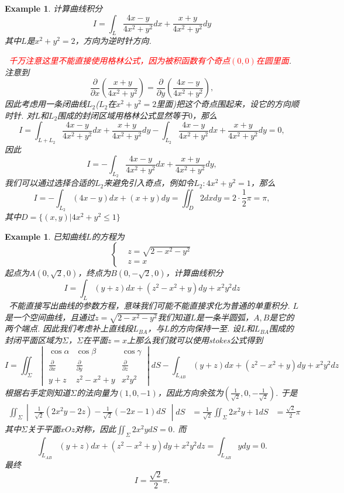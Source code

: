 \documentclass{article}
\newtheorem{example}[theorem]{Example}
\newcommand{\hints}{{\color{blue} \text{hints}}}
\newcommand{\redt}[1]{\textcolor{red}{#1}}
\begin{document}
\begin{example}
\rm 计算曲线积分
$$
I = \int_L \frac{4x-y}{4x^2 + y^2}dx + \frac{x+y}{4x^2+y^2}dy
$$
其中$L$是$x^2+y^2 = 2$，方向为逆时针方向. 

\hints\ \redt{千万注意这里不能直接使用格林公式，因为被积函数有个奇点$(0,0)$在圆里面}. 注意到
$$
\frac{\partial }{\partial x}\left( \frac{x+y}{4x^2+y^2} \right) = \frac{\partial }{\partial y}\left( \frac{4x-y}{4x^2 + y^2} \right),
$$
因此考虑用一条闭曲线$L_2$($L_2$在$x^2 + y^2 = 2$里面)把这个奇点围起来，设它的方向顺时针. 对$L$和$L_2$围成的封闭区域用格林公式显然等于$0$，那么
$$
I = \int_{L+L_2}  \frac{4x-y}{4x^2 + y^2}dx + \frac{x+y}{4x^2+y^2}dy - \int_{L_2}\frac{4x-y}{4x^2 + y^2}dx + \frac{x+y}{4x^2+y^2}dy = 0,
$$
因此
$$
I = - \int_{L_2}\frac{4x-y}{4x^2 + y^2}dx + \frac{x+y}{4x^2+y^2}dy,
$$
我们可以通过选择合适的$L_2$来避免引入奇点，例如令$L_2: 4x^2+y^2=1$，那么
$$
I = - \int_{L_2} (4x-y) dx + (x+y) dy = \iint_{D} 2dxdy = 2\cdot \frac{1}{2}\pi = \pi, 
$$
其中$D=\{(x,y)|4x^2+y^2 \leq 1 \}$
\end{example}

\begin{example}
\rm 已知曲线$L$的方程为
$$
\left\{
\begin{aligned}
&z = \sqrt{2-x^2-y^2} \\
&z = x
\end{aligned}\right. 
$$
起点为$A(0,\sqrt{2},0)$，终点为$B(0,-\sqrt{2},0)$，计算曲线积分
$$
I = \int_L (y+z)dx+(z^2-x^2+y)dy+x^2y^2dz
$$
\hints\ 不能直接写出曲线的参数方程，意味我们可能不能直接求化为普通的单重积分. $L$是一个空间曲线，且通过$z=\sqrt{2-x^2-y^2}$我们知道$L$是一条半圆弧，$A,B$是它的两个端点. 因此我们考虑补上直线段$L_{BA}$，与$L$的方向保持一至. 设$L$和$L_{BA}$围成的封闭平面区域为$\Sigma$，$\Sigma$在平面$z=x$上那么我们就可以使用stokes公式得到
$$
I=\iint_\Sigma \begin{vmatrix}
\cos \alpha & \cos \beta & \cos \gamma \\
\frac{\partial}{\partial x} & \frac{\partial}{\partial y} & \frac{\partial}{\partial z} \\
y+z & z^2-x^2+y & x^2y^2 
\end{vmatrix}dS-\int_{L_{AB}} (y+z)dx+(z^2-x^2+y)dy+x^2y^2dz
$$
根据右手定则知道$\Sigma$的法向量为$(1,0,-1)$，因此方向余弦为$(\frac{1}{\sqrt{2}},0,-\frac{1}{\sqrt{2}})$. 于是
$$
\begin{aligned}
\iint_\Sigma \begin{vmatrix}
\frac{1}{\sqrt{2}}(2x^2y -2z) - \frac{1}{\sqrt{2}}(-2x-1)dS
\end{vmatrix}dS &= \frac{1}{\sqrt{2}} \iint_\Sigma 2x^2y +1 dS 
&= \frac{\sqrt{2}}{2}\pi
\end{aligned}
$$
其中$\Sigma$关于平面$xOz$对称，因此$\iint_\Sigma 2x^2ydS = 0$. 而
$$
\int_{L_{AB}} (y+z)dx+(z^2-x^2+y)dy+x^2y^2dz = \int_{L_{AB}} ydy = 0.
$$
最终
$$
I = \frac{\sqrt{2}}{2}\pi. 
$$
\end{example}
\end{document}

